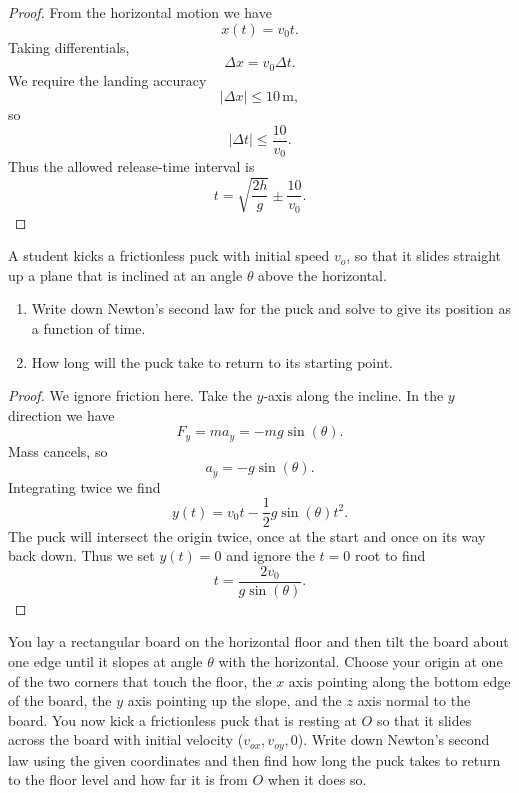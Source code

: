 \begin{proof}
    From the horizontal motion we have
    \[
    x(t) = v_0 t.
    \]
    Taking differentials,
    \[
    \Delta x = v_0 \Delta t.
    \]
    We require the landing accuracy
    \[
    |\Delta x| \le 10\,\mathrm{m},
    \]
    so
    \[
    |\Delta t| \le \frac{10}{v_0}.
    \]
    Thus the allowed release-time interval is
    \[
    t = \sqrt{\frac{2h}{g}} \pm \frac{10}{v_0}.
    \]
\end{proof}


\begin{tcolorbox}[title=Problem 37, breakable]
    A student kicks a frictionless puck with 
    initial speed $v_o$, so that it slides 
    straight up a plane that is inclined 
    at an angle $\theta$ above the horizontal.
    \begin{enumerate}
        \item Write down Newton's second law for 
        the puck and solve to give its position 
        as a function of time.
        \item How long will the puck take to 
        return to its starting point.
    \end{enumerate}
\end{tcolorbox}

\begin{proof}
    We ignore friction here.
    Take the $y$-axis along the incline.
    In the $y$ direction we have 
    \[F_y = m a_y = - m g \sin(\theta).\]
    Mass cancels, so
    \[a_y = - g \sin(\theta).\]
    Integrating twice we find 
    \[y(t) = v_0 t - \frac{1}{2} g \sin(\theta) t^2.\]
    The puck will intersect the origin twice, once at the start 
    and once on its way back down.
    Thus we set $y(t) = 0$ and ignore the $t = 0$ root to find 
    \[t = \frac{2 v_0}{g \sin(\theta)}.\]
\end{proof}


\begin{tcolorbox}[title=Problem 38, breakable]
    You lay a rectangular board on the horizontal 
    floor and then tilt the board about one edge 
    until it slopes at angle $\theta$ with the 
    horizontal.
    Choose your origin at one of the two corners 
    that touch the floor, the $x$ axis pointing
    along the bottom edge of the board, the $y$ axis 
    pointing up the slope, and the $z$ axis 
    normal to the board. You now kick a frictionless 
    puck that is resting at $O$ so that it slides 
    across the board with initial velocity 
    ($v_{ox}, v_{oy}, 0$). Write down Newton's 
    second law using the given coordinates and 
    then find how long the puck takes to return to 
    the floor level and how far it is from $O$ 
    when it does so.
\end{tcolorbox}


